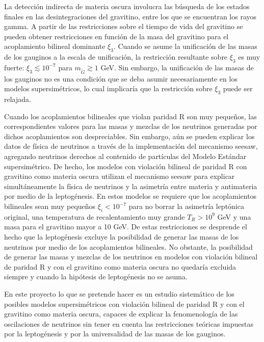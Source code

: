 La detección indirecta de materia oscura involucra las búsqueda de los estados finales en las desintegraciones del gravitino, entre los que se encuentran los rayos gamma. A partir de las restricciones sobre el tiempo de vida del gravitino se pueden obtener restricciones en función de la masa del gravitino para el acoplamiento bilineal dominante $\xi_3$. Cuando se asume la unificación de las masas de los gauginos a la escala de unificación, la restricción resultante sobre $\xi_3$ es muy fuerte: $\xi_3\lesssim 10^{-7}$ para $m_{\tilde G}\gtrsim 1$ GeV.  Sin embargo, la unificación de las masas de los gauginos no es una condición que se deba asumir necesariamente en los modelos supersimétricos, lo cual implicaría que la restricción sobre $\xi_3$ puede ser relajada.

Cuando los acoplamientos bilineales que violan paridad R son muy pequeños, las correspondientes valores para las masas y mezclas de los neutrinos generadas por dichos acoplamientos son despreciables. Sin embargo, aún se pueden explicar los datos de física de neutrinos a través de la implementación del mecanismo seesaw, agregando neutrinos derechos al contenido de partículas del Modelo Estándar supersimétrico. De hecho, los modelos con violación bilineal de paridad R con gravitino como materia oscura utilizan el mecanismo seesaw para explicar simultáneamente la física de neutrinos y la asimetría entre materia y antimateria por medio de la leptogénesis. En estos modelos se requiere que los acoplamientos bilineales sean muy pequeños $\xi_i<10^{-7}$ para no borrar la asimetría leptónica original, una temperatura de recalentamiento muy grande $T_R>10^9$ GeV y una masa para el gravitino mayor a 10 GeV. De estas restricciones se desprende el hecho que la leptogénesis excluye la posibilidad de generar las masas de los neutrinos por medio de los acoplamientos bilineales. No obstante, la posibilidad de generar las masas y mezclas de los neutrinos en modelos con violación bilineal de paridad R y con el gravitino como materia oscura no quedaría excluida siempre y cuando la hipótesis de leptogénesis no se asuma.

En este proyecto lo que se pretende hacer es un estudio sistemático de los posibles modelos supersimétricos con violación bilineal de paridad R y con el gravitino como materia oscura, capaces de explicar la fenomenología de las oscilaciones de neutrinos sin tener en cuenta las restricciones teóricas impuestas por la leptogénesis  y por la universalidad de las masas de los gauginos. 

